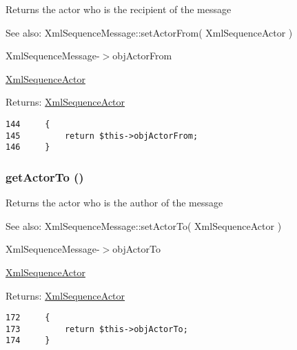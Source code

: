 Returns the actor who is the recipient of the message

\begin{Desc}
\item[See also:]XmlSequenceMessage::setActorFrom( XmlSequenceActor ) 

XmlSequenceMessage-$>$objActorFrom 

\hyperlink{class_xml_sequence_actor}{XmlSequenceActor} \end{Desc}
\begin{Desc}
\item[Returns:]\hyperlink{class_xml_sequence_actor}{XmlSequenceActor} \end{Desc}


\begin{Code}\begin{verbatim}144     {
145         return $this->objActorFrom;
146     }
\end{verbatim}
\end{Code}


\hypertarget{class_xml_sequence_message_63824a7a88f53de045b4d2d641594e7e}{
\subsubsection[{getActorTo}]{\setlength{\rightskip}{0pt plus 5cm}getActorTo ()}}
\label{class_xml_sequence_message_63824a7a88f53de045b4d2d641594e7e}


Returns the actor who is the author of the message

\begin{Desc}
\item[See also:]XmlSequenceMessage::setActorTo( XmlSequenceActor ) 

XmlSequenceMessage-$>$objActorTo 

\hyperlink{class_xml_sequence_actor}{XmlSequenceActor} \end{Desc}
\begin{Desc}
\item[Returns:]\hyperlink{class_xml_sequence_actor}{XmlSequenceActor} \end{Desc}


\begin{Code}\begin{verbatim}172     {
173         return $this->objActorTo;
174     }
\end{verbatim}
\end{Code}


